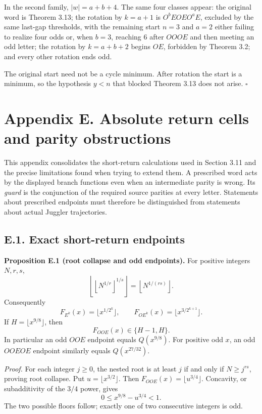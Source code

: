 \documentclass[12pt]{article}
\begin{document}
In the second family, \(\lvert w\rvert=a+b+4\). The same four classes
appear: the original word is Theorem 3.13; the rotation by \(k=a+1\) is
\(O^bEOEO^aE\), excluded by the same last-gap thresholds, with the
remaining start \(n=3\) and \(a=2\) either failing to realize four odds
or, when \(b=3\), reaching \(6\) after \(OOOE\) and then meeting an odd
letter; the rotation by \(k=a+b+2\) begins \(OE\), forbidden by Theorem
3.2; and every other rotation ends odd.

The original start need not be a cycle minimum. After rotation the start
is a minimum, so the hypothesis \(y<n\) that blocked Theorem 3.13 does
not arise. \(\square\)

\section{Appendix E. Absolute return cells and parity
obstructions}\label{appendix-e.-absolute-return-cells-and-parity-obstructions}

This appendix consolidates the short-return calculations used in Section
3.11 and the precise limitations found when trying to extend them. A
prescribed word acts by the displayed branch functions even when an
intermediate parity is wrong. Its \emph{guard} is the conjunction of the
required source parities at every letter. Statements about prescribed
endpoints must therefore be distinguished from statements about actual
Juggler trajectories.

\subsection{E.1. Exact short-return
endpoints}\label{e.1.-exact-short-return-endpoints}

\textbf{Proposition E.1 (root collapse and odd endpoints).} For positive
integers \(N,r,s\), \[
\left\lfloor\left\lfloor N^{1/r}\right\rfloor^{1/s}\right\rfloor
=\left\lfloor N^{1/(rs)}\right\rfloor.
\] Consequently \[
F_{E^k}(x)=\lfloor x^{1/2^k}\rfloor,\qquad
F_{OE^k}(x)=\lfloor x^{3/2^{k+1}}\rfloor.
\] If \(H=\lfloor x^{9/8}\rfloor\), then \[
F_{OOE}(x)\in\{H-1,H\}.
\] In particular an odd \(OOE\) endpoint equals \(Q(x^{9/8})\). For
positive odd \(x\), an odd \(OOEOE\) endpoint similarly equals
\(Q(x^{27/32})\).

\emph{Proof.} For each integer \(j\ge0\), the nested root is at least
\(j\) if and only if \(N\ge j^{rs}\), proving root collapse. Put
\(u=\lfloor x^{3/2}\rfloor\). Then
\(F_{OOE}(x)=\lfloor u^{3/4}\rfloor\). Concavity, or subadditivity of
the \(3/4\) power, gives \[
0\le x^{9/8}-u^{3/4}<1.
\] The two possible floors follow; exactly one of two consecutive
integers is odd.
\end{document}
